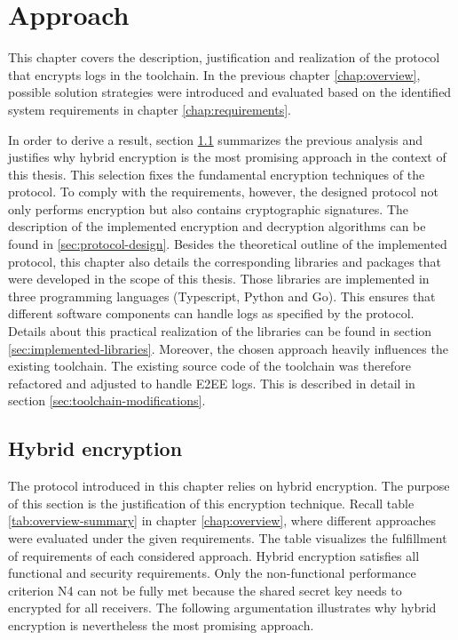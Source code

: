 \documentclass[../main.tex]{subfiles}
\begin{document}
\chapter{Approach}
\label{chap:approach}

This chapter covers the description, justification and realization of the protocol that encrypts logs in the toolchain.
In the previous chapter \ref{chap:overview}, possible solution strategies were introduced and evaluated based on the identified system requirements in chapter \ref{chap:requirements}.

In order to derive a result, section \ref{sec:justification} summarizes the previous analysis and justifies why hybrid encryption is the most promising approach in the context of this thesis.
This selection fixes the fundamental encryption techniques of the protocol.
To comply with the requirements, however, the designed protocol not only performs encryption but also contains cryptographic signatures.
The description of the implemented encryption and decryption algorithms can be found in \ref{sec:protocol-design}.
Besides the theoretical outline of the implemented protocol, this chapter also details the corresponding libraries and packages that were developed in the scope of this thesis.
Those libraries are implemented in three programming languages (Typescript, Python and Go).
This ensures that different software components can handle logs as specified by the protocol.
Details about this practical realization of the libraries can be found in section \ref{sec:implemented-libraries}.
Moreover, the chosen approach heavily influences the existing toolchain.
The existing source code of the toolchain was therefore refactored and adjusted to handle E2EE logs.
This is described in detail in section \ref{sec:toolchain-modifications}.

\section{Hybrid encryption}
\label{sec:justification}
The protocol introduced in this chapter relies on hybrid encryption.
The purpose of this section is the justification of this encryption technique.
Recall table \ref{tab:overview-summary} in chapter \ref{chap:overview}, where different approaches were evaluated under the given requirements.
The table visualizes the fulfillment of requirements of each considered approach.
Hybrid encryption satisfies all functional and security requirements.
Only the non-functional performance criterion N4 can not be fully met because the shared secret key needs to encrypted for all receivers.
The following argumentation illustrates why hybrid encryption is nevertheless the most promising approach.
\end{document}
